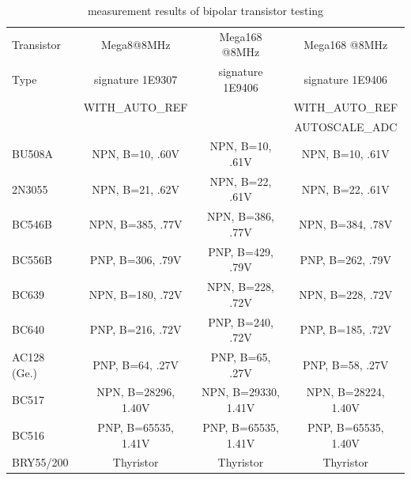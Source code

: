\begin{table}[H]
  \begin{center}
    \begin{tabular}{| l | c | c | c |}
    \hline
     Transistor & Mega8@8MHz & Mega168 @8MHz & Mega168 @8MHz \\
     Type   & signature 1E9307 & signature 1E9406 & signature 1E9406 \\
           & WITH\_AUTO\_REF &  & WITH\_AUTO\_REF \\
           &                 &  & AUTOSCALE\_ADC \\
    \hline
    \hline
BU508A & NPN, B=10, .60V & NPN, B=10, .61V & NPN, B=10, .61V\\
    \hline
2N3055 & NPN, B=21, .62V & NPN, B=22, .61V & NPN, B=22, .61V\\
    \hline
BC546B & NPN, B=385, .77V & NPN, B=386, .77V & NPN, B=384, .78V\\
    \hline
BC556B & PNP, B=306, .79V & PNP, B=429, .79V & PNP, B=262, .79V\\
    \hline
BC639 & NPN, B=180, .72V & NPN, B=228, .72V & NPN, B=228, .72V\\

    \hline
BC640 & PNP, B=216, .72V & PNP, B=240, .72V & PNP, B=185, .72V\\
    \hline
AC128 (Ge.) & PNP, B=64, .27V & PNP, B=65, .27V & PNP, B=58, .27V\\
    \hline
BC517 & NPN, B=28296, 1.40V & NPN, B=29330, 1.41V & NPN, B=28224, 1.40V\\
    \hline
BC516 & PNP, B=65535, 1.41V & PNP, B=65535, 1.41V & PNP, B=65535, 1.40V\\
    \hline
BRY55/200 & Thyristor & Thyristor & Thyristor\\
    \hline
    \end{tabular}
  \end{center}
  \caption{measurement results of bipolar transistor testing}
  \label{tab:bipolar} 
\end{table}

